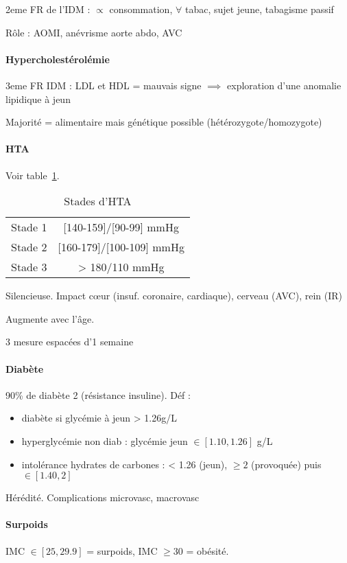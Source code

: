 \documentclass{article}
\begin{document}
2eme FR de l'IDM : $\propto$ consommation, $\forall$ tabac, sujet jeune, tabagisme passif

Rôle : AOMI, anévrisme aorte abdo, AVC

\paragraph{Hypercholestérolémie}
3eme FR IDM : \inc LDL et \dec HDL = mauvais signe $\implies$ exploration d'une
anomalie lipidique à jeun

Majorité = alimentaire mais génétique possible (hétérozygote/homozygote)

\paragraph{HTA}
Voir table~\ref{tab:hta_stades}.
\begin{table}
  \centering
  \begin{tabular}{cc}
      Stade 1 & [140-159]/[90-99] mmHg\\
Stade 2 & [160-179]/[100-109] mmHg\\
Stade 3 & > 180/110 mmHg
  \end{tabular}
  \caption{Stades d'HTA}
  \label{tab:hta_stades}
\end{table}

Silencieuse. Impact c\oe{}ur (insuf. coronaire, cardiaque), cerveau (AVC), rein (IR)

Augmente avec l'âge.

3 mesure espacées d'1 semaine

\paragraph{Diabète}
90\% de diabète 2 (résistance insuline). Déf :
\begin{itemize}
  \item diabète si glycémie à jeun > 1.26g/L
  \item hyperglycémie non diab : glycémie jeun $\in [1.10, 1.26]$ g/L
  \item intolérance hydrates de carbones : < 1.26 (jeun), $\ge 2$ (provoquée)
    puis $\in [1.40, 2]$
\end{itemize}
Hérédité. Complications microvasc, macrovasc

\paragraph{Surpoids}
IMC $\in [25, 29.9]$ = surpoids, IMC $\ge 30$ = obésité. 
\end{document}
